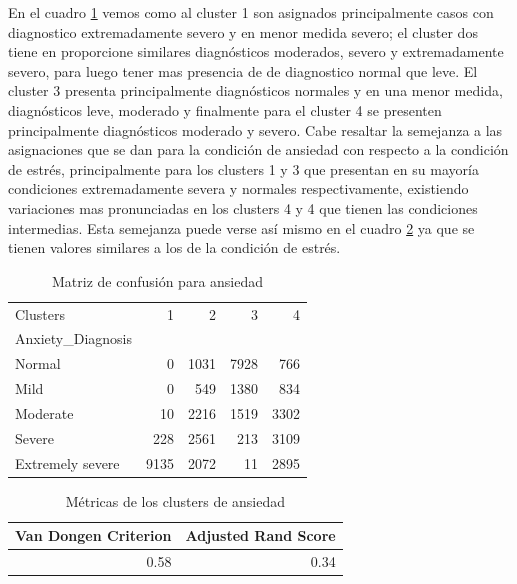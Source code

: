 En el cuadro \ref{matriz_ansiedad} vemos como al cluster 1 son asignados principalmente casos con diagnostico extremadamente severo y en menor medida severo; el cluster dos tiene en proporcione similares diagnósticos moderados, severo y extremadamente severo, para luego tener mas presencia de de diagnostico normal que leve. El cluster 3 presenta principalmente diagnósticos normales y en una menor medida, diagnósticos leve, moderado y finalmente para el cluster 4 se presenten principalmente diagnósticos moderado y severo. Cabe resaltar la semejanza a las asignaciones que se dan para la condición de ansiedad con respecto a la condición de estrés, principalmente para los clusters 1 y  3 que presentan en su mayoría condiciones extremadamente severa y normales respectivamente, existiendo variaciones mas pronunciadas en los clusters 4 y 4 que tienen las condiciones intermedias. Esta semejanza puede verse así mismo en el cuadro \ref{metricas_matriz_ansiedad} ya que se tienen valores similares a los de la condición de estrés.

\begin{table}[ht]
\centering
\caption{Matriz de confusión para ansiedad}
\begin{tabular}{lrrrr}
\toprule
Clusters &     1 &     2 &     3 &     4 \\
Anxiety\_Diagnosis &       &       &       &       \\
\midrule
Normal            &  0 &  1031 &  7928 &  766 \\
Mild              &  0 &  549 &  1380 &  834 \\
Moderate          &  10 &  2216 &  1519 &  3302 \\
Severe            &  228 &  2561 &  213 &  3109 \\
Extremely severe  &  9135 &  2072 &  11 &  2895 \\
\bottomrule
\end{tabular}
\label{matriz_ansiedad} 
\end{table}%


\begin{table}[ht]
\centering
\caption{Métricas de los clusters de ansiedad}
\begin{tabular}{rr}
\toprule
 Van Dongen Criterion &  Adjusted Rand Score \\
\midrule
0.58 & 0.34 \\
\bottomrule
\end{tabular}
\label{metricas_matriz_ansiedad}
\end{table}%

